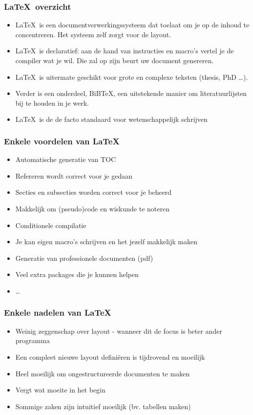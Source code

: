\documentclass{beamer}
\begin{document}
\begin{frame}
	\frametitle{\LaTeX\ overzicht}
	
	\begin{itemize}
		\item \LaTeX\ is een documentverwerkingssysteem dat toelaat om je op de inhoud te concentreren. Het systeem zelf zorgt voor de layout. 
		\pause
		\item \LaTeX\ is declaratief: aan de hand van instructies en macro's vertel je de compiler wat je wil. Die zal op zijn beurt uw document genereren. 
		\pause
		\item \LaTeX\ is uitermate geschikt voor grote en complexe teksten (thesis, PhD \dots). 
		\pause 
		\item Verder is een onderdeel, BiBTeX, een uitstekende manier om literatuurlijsten bij te houden in je werk.
		\pause
		\item \LaTeX\ is de de facto standaard voor wetenschappelijk schrijven
	\end{itemize}
\end{frame}

\begin{frame}
	\frametitle{Enkele voordelen van \LaTeX}
	
	\begin{itemize}
		\item Automatische generatie van TOC
		\item Refereren wordt correct voor je gedaan
		\item Secties en subsecties worden correct voor je beheerd
		\item Makkelijk om (pseudo)code en wiskunde te noteren
		\item Conditionele compilatie
		\item Je kan eigen macro's schrijven en het jezelf makkelijk maken
		\item Generatie van professionele documenten (pdf)
		\item Veel extra packages die je kunnen helpen
		\item \dots
	\end{itemize}
\end{frame}

\begin{frame}
	\frametitle{Enkele nadelen van \LaTeX}
		\begin{itemize}
		\item Weinig zeggenschap over layout - wanneer dit de focus is beter ander programma
		\item Een compleet nieuwe layout defini\"eren is tijdrovend en moeilijk
		\item Heel moeilijk om ongestructureerde documenten te maken
		\item Vergt wat moeite in het begin 
		\item Sommige zaken zijn intuitief moeilijk (bv. tabellen maken)
			\end{itemize}
\end{frame}
\end{document}
